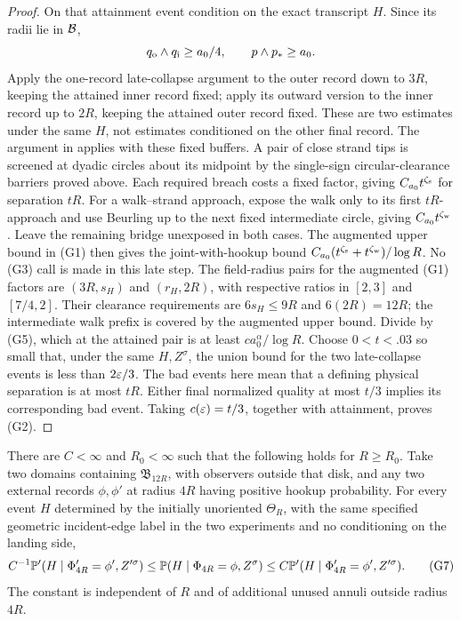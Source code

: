 \begin{proof}
On that attainment event condition on the exact transcript \(H\).  Since
its radii lie in \({\cal B}\),
\[
 q_{\rm o}\wedge q_{\rm i}\ge a_0/4,\qquad p\wedge p_*\ge a_0.
\]
Apply the one-record late-collapse argument to the outer record down to
\(3R\), keeping the attained inner record fixed; apply its outward version
to the inner record up to \(2R\), keeping the attained outer record fixed.
These are two estimates under the same \(H\), not estimates conditioned
on the other final record.  The argument in
\cite[proof of Lemma~3.15, equations (3.40)--(3.42)]{SSdiscrete} applies
with these fixed buffers.  A pair of close strand tips is screened at
dyadic circles about its midpoint by the single-sign circular-clearance
barriers proved above.  Each required breach costs a fixed factor, giving
\(C_{a_0}t^{\zeta_{\rm s}}\) for separation \(tR\).  For a walk--strand approach, expose
the walk only to its first \(tR\)-approach and use Beurling up to the next
fixed intermediate circle, giving \(C_{a_0}t^{\zeta_{\rm w}}\).  Leave the remaining
bridge unexposed in both cases.  The augmented upper bound in (G1) then
gives the joint-with-hookup bound
\(C_{a_0}(t^{\zeta_{\rm s}}+t^{\zeta_{\rm w}})/\log R\).  No (G3) call is
made in this late step.  The field-radius pairs for the augmented (G1)
factors are \((3R,s_H)\) and \((r_H,2R)\), with respective ratios in
\([2,3]\) and \([7/4,2]\).  Their clearance requirements are
\(6s_H\le9R\) and \(6(2R)=12R\); the intermediate walk prefix is covered
by the augmented upper bound.  Divide by (G5), which at the attained pair
is at least \(c a_0^\alpha/\log R\).  Choose \(0<t<.03\) so small that, under the
same \(H,Z^\sigma\), the union bound for the two late-collapse events is
less than \(2\varepsilon/3\).  The bad events here mean that a defining physical
separation is at most \(tR\).  Either final normalized quality at most
\(t/3\) implies its corresponding bad event.  Taking
\(c(\varepsilon)=t/3\), together with attainment, proves (G2).
\end{proof}

\begin{proposition}
\label{g:sample-comparison}
There are \(C<\infty\) and \(R_0<\infty\) such that the following holds
for \(R\geq R_0\). Take two domains
containing \(\mathfrak B_{12R}\), with observers outside that disk,
and any two external records \(\phi,\phi'\) at radius \(4R\) having
positive hookup probability. For every event \(H\) determined by
the initially unoriented \(\Theta_R\), with the same specified geometric
incident-edge label in the two experiments and no conditioning on the
landing side,
\[
 C^{-1}\mathbb P'(H\mid\Phi'_{4R}=\phi',Z'^\sigma)
 \leq \mathbb P(H\mid\Phi_{4R}=\phi,Z^\sigma)
 \leq C\mathbb P'(H\mid\Phi'_{4R}=\phi',Z'^\sigma).
 \tag{G7}
\]
The constant is independent of \(R\) and of additional unused annuli
outside radius \(4R\).
\end{proposition}

